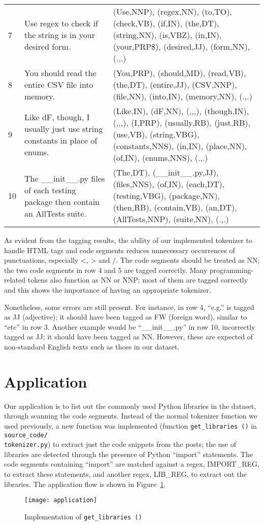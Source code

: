 \begin{table}[htp]
\begin{tabu}{X[0.2,l]X[1,l]X[2,l]}
    7 &
    Use regex to check if the string is in your desired form. &
    (Use,NNP), (regex,NN), (to,TO), (check,VB), (if,IN), (the,DT),
    (string,NN), (is,VBZ), (in,IN), (your,PRP\$), (desired,JJ), (form,NN),
    (.,.) \\
    8 & 
    You should read the entire CSV file into memory. &
    (You,PRP), (should,MD), (read,VB), (the,DT), (entire,JJ), (CSV,NNP),
    (file,NN), (into,IN), (memory,NN), (.,.) \\
    9 & 
    Like dF, though, I usually just use string constants in place of enums. &
    (Like,IN), (dF,NN), (,,,), (though,IN), (,,,), (I,PRP), (usually,RB),
    (just,RB), (use,VB), (string,VBG), (constants,NNS), (in,IN), (place,NN),
    (of,IN), (enums,NNS), (.,.) \\
    10 & 
    The \_\_init\_\_.py files of each testing package then contain an AllTests
    suite. &
    (The,DT), (\_\_init\_\_.py,JJ), (files,NNS), (of,IN), (each,DT),
    (testing,VBG), (package,NN), (then,RB), (contain,VB), (an,DT),
    (AllTests,NNP), (suite,NN), (.,.) \\
\end{tabu}
\end{table}

As evident from the tagging results, the ability of our implemented tokenizer
to handle HTML tags and code segments reduces unnecessary occurrences of
punctuations, especially <, > and /. The code segments should be treated as
NN; the two code segments in row 4 and 5 are tagged correctly. Many
programming-related tokens also function as NN or NNP; most of them are tagged
correctly and this shows the importance of having an appropriate tokenizer.

Nonetheless, some errors are still present. For instance, in row 4, ``e.g.''
is tagged as JJ (adjective); it should have been tagged as FW (foreign word),
similar to ``etc'' in row 3. Another example would be ``\_\_init\_\_.py'' in
row 10, incorrectly tagged as JJ; it should have been tagged as NN. However,
these are expected of non-standard English texts such as those in our dataset.

\section{Application}

Our application is to list out the commonly used Python libraries in the
dataset, through scanning the code segments. Instead of the normal tokenizer
function we used previously, a new function was implemented (function
\texttt{get\_libraries\,()} in \texttt{source\_code/\\tokenizer.py}) to extract
just the code snippets from the posts; the use of libraries are
detected through the presence of Python ``import'' statements. The code
segments containing ``import'' are matched against a regex, IMPORT\_REG, to
extract these statements, and another regex, LIB\_REG, to extract out the
libraries. The application flow is shown in Figure~\ref{img:app}.

\begin{figure}[h]
\texttt{[image: application]}
\caption{Implementation of \texttt{get\_libraries\,()}}\label{img:app}
\end{figure}